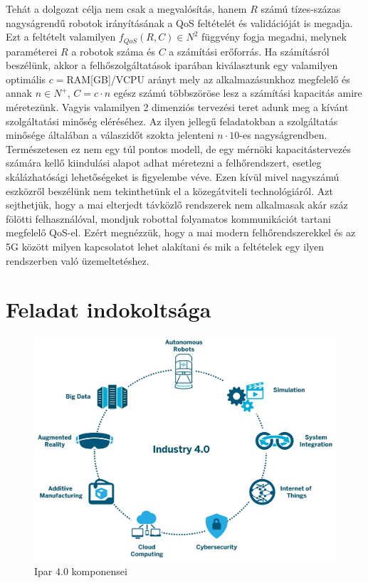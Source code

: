 Tehát a dolgozat célja nem csak a megvalósítás, hanem $R$ számú tízes-százas nagyságrendű robotok irányításának a QoS feltételét és validációját is megadja. Ezt a feltételt valamilyen $f_{QoS}(R,C)\in N^2$ függvény fogja megadni, melynek paraméterei $R$ a robotok száma és $C$ a számítási erőforrás. Ha számításról beszélünk, akkor a felhőszolgáltatások iparában kiválasztunk egy valamilyen optimális $c=$RAM[GB]/VCPU arányt mely az alkalmazásunkhoz megfelelő és annak $n\in N^+$, $C=c\cdot n$ egész számú többszöröse lesz a számítási kapacitás amire méretezünk. Vagyis valamilyen 2 dimenziós tervezési teret adunk meg a kívánt szolgáltatási minőség eléréséhez. Az ilyen jellegű feladatokban a szolgáltatás minősége általában a válaszidőt szokta jelenteni $n \cdot 10$-es nagyságrendben. Természetesen ez nem egy túl pontos modell, de egy mérnöki kapacitástervezés számára kellő kiindulási alapot adhat méretezni a felhőrendszert, esetleg skálázhatósági lehetőségeket is figyelembe véve.
Ezen kívül mivel nagyszámú eszközről beszélünk nem tekinthetünk el a közegátviteli technológiáról. Azt sejthetjük, hogy a mai elterjedt távközlő rendszerek nem alkalmasak akár száz fölötti felhasználóval, mondjuk robottal folyamatos kommunikációt tartani megfelelő QoS-el. Ezért megnézzük, hogy a mai modern felhőrendszerekkel és az 5G között milyen kapcsolatot lehet alakítani és mik a feltételek egy ilyen rendszerben való üzemeltetéshez.

\section{Feladat indokoltsága}
\begin{figure}
	\centering
	\includegraphics[width=\linewidth]{figures/industry40.png}
	\caption{Ipar 4.0 komponensei \cite{industry40}}
	\label{fig:industry40}
\end{figure}
